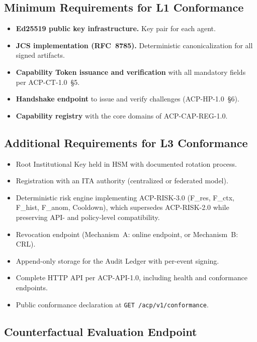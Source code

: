 \documentclass[11pt]{article}
\theoremstyle{definition}
\begin{document}
\subsection{Minimum Requirements for L1 Conformance}

\begin{itemize}[noitemsep]
  \item \textbf{Ed25519 public key infrastructure.} Key pair for each agent.
  \item \textbf{JCS implementation (RFC~8785).} Deterministic canonicalization for all signed artifacts.
  \item \textbf{Capability Token issuance and verification} with all mandatory fields per ACP-CT-1.0~\S5.
  \item \textbf{Handshake endpoint} to issue and verify challenges (ACP-HP-1.0~\S6).
  \item \textbf{Capability registry} with the core domains of ACP-CAP-REG-1.0.
\end{itemize}

\subsection{Additional Requirements for L3 Conformance}

\begin{itemize}[noitemsep]
  \item Root Institutional Key held in HSM with documented rotation process.
  \item Registration with an ITA authority (centralized or federated model).
  \item Deterministic risk engine implementing ACP-RISK-3.0 (F\_res, F\_ctx, F\_hist, F\_anom, Cooldown),
    which supersedes ACP-RISK-2.0 while preserving API- and policy-level compatibility.
  \item Revocation endpoint (Mechanism~A: online endpoint, or Mechanism~B: CRL).
  \item Append-only storage for the Audit Ledger with per-event signing.
  \item Complete HTTP API per ACP-API-1.0, including health and conformance endpoints.
  \item Public conformance declaration at \texttt{GET /acp/v1/conformance}.
\end{itemize}

\subsection{Counterfactual Evaluation Endpoint}
\end{document}

